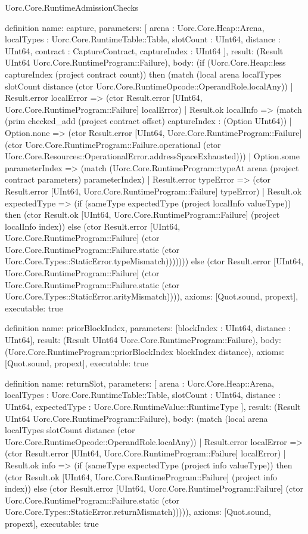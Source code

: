 \begin{lexlean}{Uorc.Core.RuntimeAdmissionChecks}
\begin{semanticmodule}
definition{
  name: capture,
  parameters: [
    arena : Uorc.Core.Heap::Arena,
    localTypes : Uorc.Core.RuntimeTable::Table,
    slotCount : UInt64,
    distance : UInt64,
    contract : CaptureContract,
    captureIndex : UInt64
  ],
  result: (Result UInt64 Uorc.Core.RuntimeProgram::Failure),
  body: (if (Uorc.Core.Heap::less captureIndex (project contract count)) then (match (local arena localTypes slotCount distance (ctor Uorc.Core.RuntimeOpcode::OperandRole.localAny))
    | Result.error localError => (ctor Result.error [UInt64, Uorc.Core.RuntimeProgram::Failure] localError)
    | Result.ok localInfo => (match (prim checked_add (project contract offset) captureIndex : (Option UInt64))
      | Option.none => (ctor Result.error [UInt64, Uorc.Core.RuntimeProgram::Failure] (ctor Uorc.Core.RuntimeProgram::Failure.operational (ctor Uorc.Core.Resources::OperationalError.addressSpaceExhausted)))
      | Option.some parameterIndex => (match (Uorc.Core.RuntimeProgram::typeAt arena (project contract parameters) parameterIndex)
        | Result.error typeError => (ctor Result.error [UInt64, Uorc.Core.RuntimeProgram::Failure] typeError)
        | Result.ok expectedType => (if (sameType expectedType (project localInfo valueType)) then (ctor Result.ok [UInt64, Uorc.Core.RuntimeProgram::Failure] (project localInfo index)) else (ctor Result.error [UInt64, Uorc.Core.RuntimeProgram::Failure] (ctor Uorc.Core.RuntimeProgram::Failure.static (ctor Uorc.Core.Types::StaticError.typeMismatch))))))) else (ctor Result.error [UInt64, Uorc.Core.RuntimeProgram::Failure] (ctor Uorc.Core.RuntimeProgram::Failure.static (ctor Uorc.Core.Types::StaticError.arityMismatch)))),
  axioms: [Quot.sound, propext],
  executable: true
}

definition{
  name: priorBlockIndex,
  parameters: [blockIndex : UInt64, distance : UInt64],
  result: (Result UInt64 Uorc.Core.RuntimeProgram::Failure),
  body: (Uorc.Core.RuntimeProgram::priorBlockIndex blockIndex distance),
  axioms: [Quot.sound, propext],
  executable: true
}

definition{
  name: returnSlot,
  parameters: [
    arena : Uorc.Core.Heap::Arena,
    localTypes : Uorc.Core.RuntimeTable::Table,
    slotCount : UInt64,
    distance : UInt64,
    expectedType : Uorc.Core.RuntimeValue::RuntimeType
  ],
  result: (Result UInt64 Uorc.Core.RuntimeProgram::Failure),
  body: (match (local arena localTypes slotCount distance (ctor Uorc.Core.RuntimeOpcode::OperandRole.localAny))
    | Result.error localError => (ctor Result.error [UInt64, Uorc.Core.RuntimeProgram::Failure] localError)
    | Result.ok info => (if (sameType expectedType (project info valueType)) then (ctor Result.ok [UInt64, Uorc.Core.RuntimeProgram::Failure] (project info index)) else (ctor Result.error [UInt64, Uorc.Core.RuntimeProgram::Failure] (ctor Uorc.Core.RuntimeProgram::Failure.static (ctor Uorc.Core.Types::StaticError.returnMismatch))))),
  axioms: [Quot.sound, propext],
  executable: true
}


\end{semanticmodule}
\end{lexlean}
